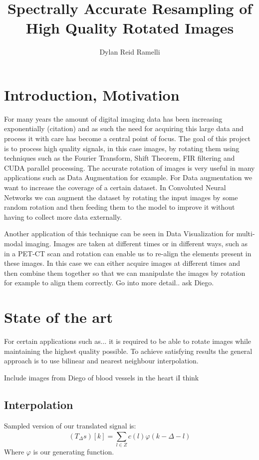 \documentclass[]{usiinfbachelorproject}
\title{Spectrally Accurate Resampling of High Quality Rotated Images}
\author{Dylan Reid Ramelli}
\begin{document}
	
	\maketitle	
	\section{Introduction, Motivation}\label{introduction}
	For many years the amount of digital imaging data has been increasing exponentially (citation) and as such the need for acquiring this large data and process it with care has become a central point of focus. The goal of this project is to process high quality signals, in this case images, by rotating them using techniques such as the Fourier Transform, Shift Theorem, FIR filtering and CUDA parallel processing.
	The accurate rotation of images is very useful in many applications such as Data Augmentation for example. For Data augmentation we want to increase the coverage of a certain dataset. In Convoluted Neural Networks we can augment the dataset by rotating the input images by some random rotation and then feeding them to the model to improve it without having to collect more data externally. 
	
	Another application of this technique can be seen in Data Visualization for multi-modal imaging. Images are taken at different times or in different ways, such as in a PET-CT scan and rotation can enable us to re-align the elements present in these images. In this case we can either acquire images at different times and then combine them together so that we can manipulate the images by rotation for example to align them correctly. Go into more detail.. ask Diego.
	

	
	\section{State of the art}
	For certain applications such as... it is required to be able to rotate images while maintaining the highest quality possible. To achieve satisfying results the general approach is to use bilinear and nearest neighbour interpolation.
	
	
	Include images from Diego of blood vessels in the heart iI think
	
	
	\iffalse
	
	\subsection{Interpolation}
	Sampled version of our translated signal is:
	\begin{equation}
		(T_\Delta s)[k] = \sum_{l \in Z}^{} c(l)\varphi(k - \Delta - l)
	\end{equation}
	Where $\varphi$ is our generating function.
\end{document}
